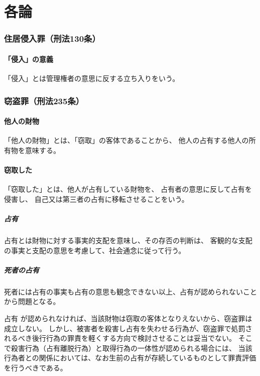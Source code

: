 \documentclass[11pt]{jsarticle}
\begin{document}
	
		
		
	

\part{各論}
	\section{住居侵入罪（刑法130条）}
		\subsection{「侵入」の意義}
			「侵入」とは管理権者の意思に反する立ち入りをいう。
		
	\section{窃盗罪（刑法235条）}
		\subsection{他人の財物}
			「他人の財物」とは、「窃取」の客体であることから、
			他人の占有する他人の所有物を意味する。
			
		\subsection{窃取した}
			「窃取した」とは、他人が占有している財物を、
			占有者の意思に反して占有を侵害し、
			自己又は第三者の占有に移転させることをいう。
			
			\subsubsection{占有}
				占有とは財物に対する事実的支配を意味し、その存否の判断は、
				客観的な支配の事実と支配の意思を考慮して、社会通念に従って行う。
			
			\subsubsection{死者の占有}
				死者には占有の事実も占有の意思も観念できない以上、占有が認められないことから問題となる。
			
				占有	が認められなければ、当該財物は窃取の客体となりえないから、窃盗罪は成立しない。
				しかし、被害者を殺害し占有を失わせる行為が、窃盗罪で処罰されるべき後行行為の罪責を軽くする方向で検討させることは妥当でない。
				そこで殺害行為（占有離脱行為）と取得行為の一体性が認められる場合には、
				当該行為者との関係においては、なお生前の占有が存続しているものとして罪責評価を行うべきである。
\end{document}
